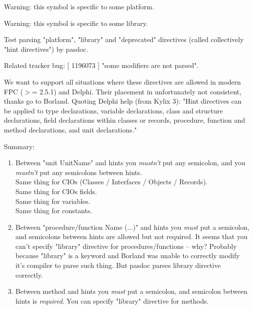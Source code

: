 \documentclass{report}
\begin{document}
Warning: this symbol is specific to some platform.

Warning: this symbol is specific to some library.

Test parsing "platform", "library" and "deprecated" directives (called collectively "hint directives") by pasdoc.\hfill\vspace*{1ex}



Related tracker bug: [ 1196073 ] "some modifiers are not parsed".

We want to support all situations where these directives are allowed in modern FPC ({$>$}= 2.5.1) and Delphi. Their placement in unfortunately not consistent, thanks go to Borland. Quoting Delphi help (from Kylix 3): "Hint directives can be applied to type declarations, variable declarations, class and structure declarations, field declarations within classes or records, procedure, function and method declarations, and unit declarations."

Summary:

\begin{enumerate}
\setcounter{enumi}{0} \setcounter{enumii}{0} \setcounter{enumiii}{0} \setcounter{enumiv}{0} 
\item  Between "unit UnitName" and hints you \textit{mustn't} put any semicolon, and you \textit{mustn't} put any semicolons between hints. \\{} Same thing for CIOs (Classes / Interfaces / Objects / Records). \\{} Same thing for CIOs fields. \\{} Same thing for variables. \\{} Same thing for constants.
\setcounter{enumi}{1} \setcounter{enumii}{1} \setcounter{enumiii}{1} \setcounter{enumiv}{1} 
\item  Between "procedure/function Name (...)" and hints you \textit{must} put a semicolon, and semicolons between hints are allowed but not required. It seems that you can't specify "library" directive for procedures/functions -- why? Probably because "library" is a keyword and Borland was unable to correctly modify it's compiler to parse such thing. But pasdoc parses library directive correctly.
\setcounter{enumi}{2} \setcounter{enumii}{2} \setcounter{enumiii}{2} \setcounter{enumiv}{2} 
\item  Between method and hints you \textit{must} put a semicolon, and semicolon between hints is \textit{required}. You can specify "library" directive for methods.
\end{enumerate}
\end{document}
